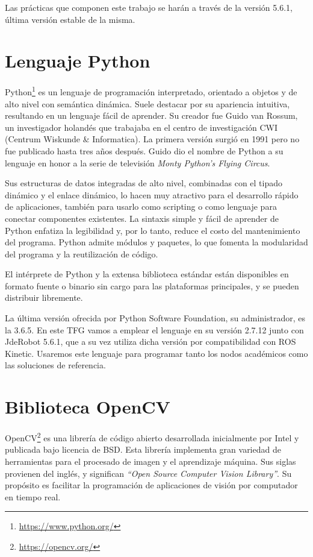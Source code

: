 Las prácticas que componen este trabajo se harán a través de la versión 5.6.1, última versión estable de la misma.

\section{Lenguaje Python}
Python\footnote{\url{https://www.python.org/}} es un lenguaje de programación interpretado, orientado a objetos y de alto nivel con semántica dinámica. Suele destacar por su apariencia intuitiva, resultando en un lenguaje fácil de aprender. Su creador fue Guido van Rossum, un investigador holandés que trabajaba en el centro de investigación CWI (Centrum Wiskunde \& Informatica). La primera versión surgió en 1991 pero no fue publicado hasta tres años después. Guido dio el nombre de Python a su lenguaje en honor a la serie de televisión \textit{Monty Python’s Flying Circus}.

Sus estructuras de datos integradas de alto nivel, combinadas con el tipado dinámico y el enlace dinámico, lo hacen muy atractivo para el desarrollo rápido de aplicaciones, también para usarlo como scripting o como lenguaje para conectar componentes existentes. La sintaxis simple y fácil de aprender de Python enfatiza la legibilidad y, por lo tanto, reduce el costo del mantenimiento del programa. Python admite módulos y paquetes, lo que fomenta la modularidad del programa y la reutilización de código. 

El intérprete de Python y la extensa biblioteca estándar están disponibles en formato fuente o binario sin cargo para las plataformas principales, y se pueden distribuir libremente.

La última versión ofrecida por Python Software Foundation, su administrador, es la 3.6.5. En este TFG vamos a emplear el lenguaje en su versión 2.7.12 junto con JdeRobot 5.6.1, que a su vez utiliza dicha versión por compatibilidad con ROS Kinetic. Usaremos este lenguaje para programar tanto los nodos académicos como las soluciones de referencia.

\section{Biblioteca OpenCV}
OpenCV\footnote{\url{https://opencv.org/}} es una librería de código abierto desarrollada inicialmente por Intel y publicada bajo licencia de BSD. Esta librería implementa gran variedad de herramientas para el procesado de imagen y el aprendizaje máquina. Sus siglas provienen del inglés, y significan \textit{“Open Source Computer Vision Library”}. Su propósito es facilitar la programación de aplicaciones de visión por computador en tiempo real.

